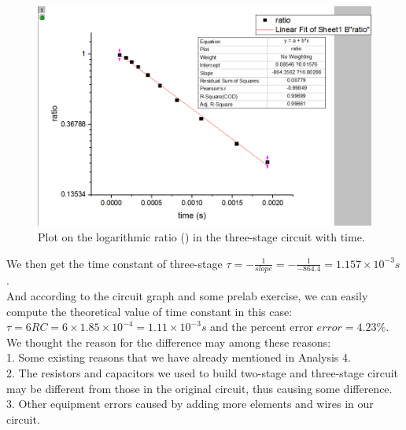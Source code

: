 \begin{figure}[!htbp]
	\centering %
	\includegraphics[width=\linewidth]{images/2_8.PNG} %
	\caption{Plot on the logarithmic ratio ({\tiny }) in the three-stage circuit with time.} %
	\label{fig:2.8} %
\end{figure}

\phantom{ } We then get the time constant of three-stage 
$\tau = -\frac{1}{slope} = -\frac{1}{-864.4} = 1.157\times10^{-3}s$.\\ And according to the circuit graph and some prelab exercise, we can easily compute
the theoretical value of time constant in this case:\\
$\tau = 6RC = 6\times1.85\times10^{-4} = 1.11\times10^{-3}s$ and the percent error $error = 4.23\%$.\\
We thought the reason for the difference may among these reasons:\\
1. Some existing reasons that we have already mentioned in Analysis 4.\\
2. The resistors and capacitors we used to build two-stage and three-stage circuit may be different from those in the original circuit, thus causing some difference.\\
3. Other equipment errors caused by adding more elements and wires in our circuit.\\

